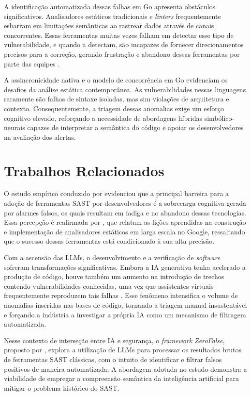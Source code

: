 A identificação automatizada dessas falhas em Go apresenta obstáculos significativos. Analisadores estáticos tradicionais e \textit{linters} frequentemente esbarram em limitações semânticas ao rastrear dados através de canais concorrentes. Essas ferramentas muitas vezes falham em detectar esse tipo de vulnerabilidade, e quando a detectam, são incapazes de fornecer direcionamentos precisos para a correção, gerando frustração e abandono dessas ferramentas por parte das equipes \cite{wu2026}. 

A assincronicidade nativa e o modelo de concorrência em Go evidenciam os desafios da análise estática contemporânea. As vulnerabilidades nessas linguagens raramente são falhas de sintaxe isoladas, mas sim violações de arquitetura e contexto. Consequentemente, a triagem dessas anomalias exige um esforço cognitivo elevado, reforçando a necessidade de abordagens híbridas simbólico-neurais capazes de interpretar a semântica do código e apoiar os desenvolvedores na avaliação dos alertas.

\section{Trabalhos Relacionados}
O estudo empírico conduzido por  evidenciou que a principal barreira para a adoção de ferramentas SAST por desenvolvedores é a sobrecarga cognitiva gerada por alarmes falsos, os quais resultam em fadiga e no abandono dessas tecnologias. Essa percepção é reafirmada por , que relatam as lições aprendidas na construção e implementação de analisadores estáticos em larga escala no Google, ressaltando que o sucesso dessas ferramentas está condicionado à sua alta precisão.

Com a ascensão das LLMs, o desenvolvimento e a verificação de \textit{software} sofreram transformações significativas. Embora a IA generativa tenha acelerado a produção de código, houve também um aumento na introdução de trechos contendo vulnerabilidades conhecidas, uma vez que assistentes virtuais frequentemente reproduzem tais falhas \cite{pearce2022copilot}. Esse fenômeno intensifica o volume de anomalias inseridas nas bases de código, tornando a triagem manual insustentável e forçando a indústria a investigar a própria IA como um mecanismo de filtragem automatizada.

Nesse contexto de interseção entre IA e segurança, o \textit{framework ZeroFalse}, proposto por , explora a utilização de LLMs para processar os resultados brutos de ferramentas SAST clássicas, com o intuito de identificar e filtrar falsos positivos de maneira automatizada. A abordagem adotada no estudo demonstra a viabilidade de empregar a compreensão semântica da inteligência artificial para mitigar o problema histórico do SAST.

